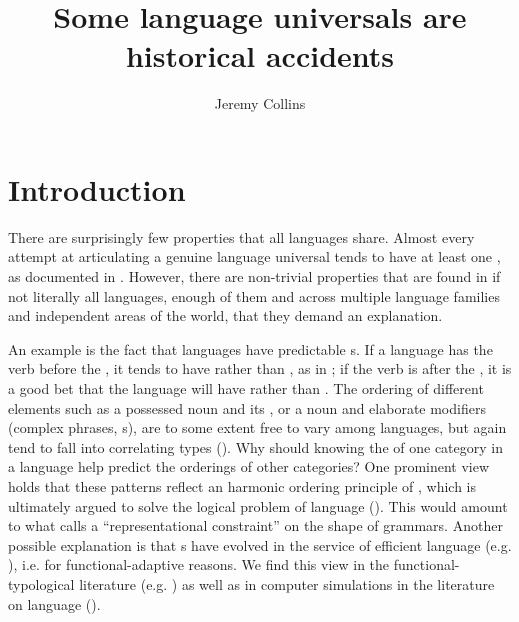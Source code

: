 \documentclass[output=paper]{langsci/langscibook}
\author{Jeremy Collins\affiliation{Radboud University Nijmegen}}
\title{Some language universals are historical accidents}
\begin{document}
\maketitle 
 
\label{p:collins:historicalaccidents} 
\section{Introduction}
 
 
There are surprisingly few properties that all languages share. Almost every attempt at articulating a genuine language universal tends to have at least one , as documented in \citet{EvansLevinson2009}. However, there are non-trivial properties that are found in if not literally all languages, enough of them and across multiple language families and independent areas of the world, that they demand an explanation.  
 

An example is the fact that languages have predictable s. If a language has the verb before the , it tends to have  rather than , as in ; if the verb is after the , it is a good bet that the language will have  rather than  \citep{Greenberg1963}. The ordering of different elements such as a possessed noun and its , or a noun and elaborate modifiers (complex  phrases, s), are to some extent free to vary among languages, but again tend to fall into correlating types (\citealt{Dryer1992,Dryer2011}). Why should knowing the  of one category in a language help predict the orderings of other categories? One prominent view holds that these patterns reflect an  harmonic ordering principle of , which is ultimately argued to solve the logical problem of language  (\citealt{Pinker1994,Baker2001,Roberts2007}). This would amount to what  calls a “representational constraint” on the shape of grammars. Another possible explanation is that s have evolved in the service of efficient language  (e.g. \citealt{Hawkins1994,KirbyHurford1997}), i.e. for functional-adaptive reasons. We find this view in the functional-typological literature (e.g. \citealt{Dryer1992,EvansLevinson2009}) as well as in computer simulations in the literature on language  (\citealt{VanEverbroeck1999}). 
\end{document}
